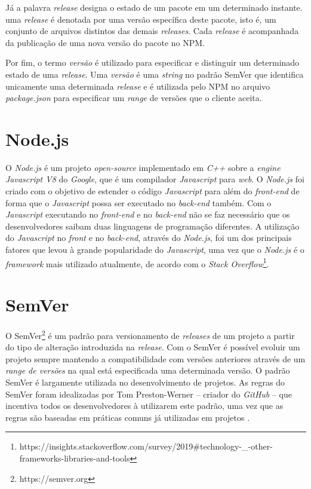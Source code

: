 Já a palavra \textit{release} designa o estado de um pacote em um determinado instante. uma \textit{release} é denotada por uma versão específica deste pacote, isto é, um conjunto de arquivos distintos das demais \textit{releases}. Cada \textit{release} é acompanhada da publicação de uma nova versão do pacote no \gls{NPM}.

Por fim, o termo \textit{versão} é utilizado para especificar e distinguir um determinado estado de uma \textit{release}. Uma \textit{versão} é uma \textit{string} no padrão \gls{SemVer} que identifica unicamente uma determinada \textit{release} e é utilizada pelo \gls{NPM} no arquivo \textit{package.json} para especificar um \textit{range} de versões que o cliente aceita.

\section{Node.js}
\label{ref-teo:node}
O \textit{Node.js} é um projeto \textit{open-source} implementado em \textit{C++} sobre a \textit{engine Javascript V8} do \textit{Google}, que é um compilador \textit{Javascript} para \textit{web}. O \textit{Node.js} foi criado com o objetivo de estender o código \textit{Javascript} para além do \textit{front-end} de forma que o \textit{Javascript} possa ser executado no \textit{back-end} também. Com o \textit{Javascript} executando no \textit{front-end} e no \textit{back-end} não se faz necessário que os desenvolvedores saibam duas linguagens de programação diferentes. A utilização do \textit{Javascript} no \textit{front} e no \textit{back-end}, através do \textit{Node.js}, foi um dos principais fatores que levou à grande popularidade do \textit{Javascript}, uma vez que o \textit{Node.js} é o \textit{framework} mais utilizado atualmente, de acordo com o \textit{Stack Overflow}\footnote{https://insights.stackoverflow.com/survey/2019\#technology-\_-other-frameworks-libraries-and-tools}.

\section{\gls{SemVer}}
\label{ref-teo:semver}
O \gls{SemVer}\footnote{https://semver.org} é um padrão para versionamento de \textit{releases} de um projeto a partir do tipo de alteração introduzida na \textit{release}. Com o \gls{SemVer} é possível evoluir um projeto sempre mantendo a compatibilidade com versões anteriores através de um \textit{range de versões} na qual está especificada uma determinada versão. O padrão \gls{SemVer} é largamente utilizada no desenvolvimento de projetos. As regras do \gls{SemVer} foram idealizadas por Tom Preston-Werner -- criador do \textit{GitHub} -- que incentiva todos os desenvolvedores à utilizarem este padrão, uma vez que as regras são baseadas em práticas comuns já utilizadas em projetos \cite{teorical_reference:semver}.

